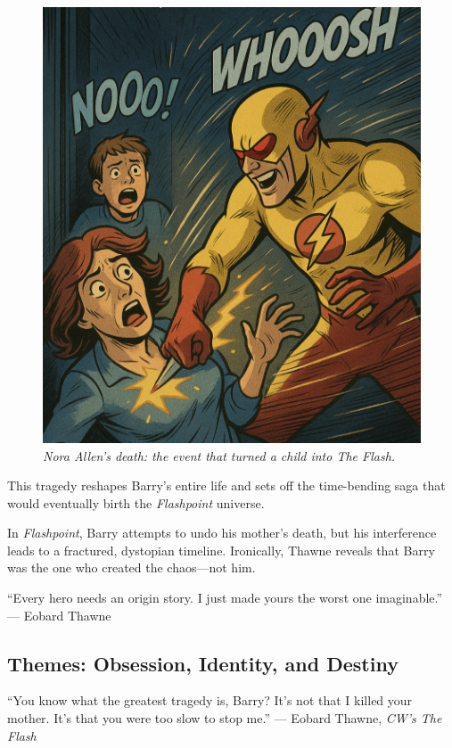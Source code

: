 \begin{figure}[h!]
  \centering
  \includegraphics[width=0.9\linewidth]{flashmomdead.png}
  \caption*{\textit{Nora Allen’s death: the event that turned a child into The Flash.}}
\end{figure}

This tragedy reshapes Barry’s entire life and sets off the time-bending saga that would eventually birth the \textit{Flashpoint} universe.

In \textit{Flashpoint}, Barry attempts to undo his mother's death, but his interference leads to a fractured, dystopian timeline. Ironically, Thawne reveals that Barry was the one who created the chaos---not him.

\begin{magquote}
“Every hero needs an origin story. I just made yours the worst one imaginable.”
\hfill --- Eobard Thawne
\end{magquote}

\subsection*{Themes: Obsession, Identity, and Destiny}
\begin{magquote}
“You know what the greatest tragedy is, Barry? It’s not that I killed your mother. It’s that you were too slow to stop me.”  
\hfill --- Eobard Thawne, \textit{CW's The Flash}
\end{magquote}


